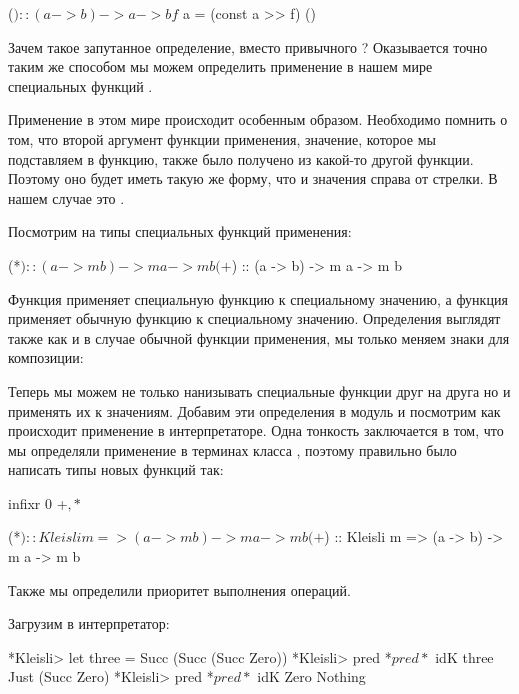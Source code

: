 \begin{code}
($) :: (a -> b) -> a -> b
f $ a = (const a >> f) ()
\end{code}

Зачем такое запутанное определение, вместо привычного ?
Оказывается точно таким же способом мы можем определить 
применение в нашем мире специальных функций .

Применение в этом мире происходит особенным образом.
Необходимо помнить о том, что второй аргумент функции применения,
значение, которое мы подставляем в функцию, также было получено 
из какой-то другой функции. Поэтому оно будет иметь такую же
форму, что и значения справа от стрелки. В нашем случае 
это \mbox{}.

Посмотрим на типы специальных функций применения:

\begin{code}
(*$) :: (a -> m b) -> m a -> m b
(+$) :: (a -> b)   -> m a -> m b
\end{code}

Функция \In{*$} применяет специальную функцию к специальному
значению, а функция \In{+$} применяет обычную функцию к 
специальному значению. Определения выглядят также как 
и в случае обычной функции применения, мы только меняем
знаки для композиции:


Теперь мы можем не только нанизывать специальные функции
друг на друга но и применять их к значениям. Добавим
эти определения в модуль  и посмотрим 
как происходит применение в интерпретаторе. Одна тонкость
заключается в том, что мы определяли применение в терминах
класса , поэтому правильно было написать типы 
новых функций так:

\begin{code}
infixr 0 +$, *$

(*$) :: Kleisli m => (a -> m b) -> m a -> m b
(+$) :: Kleisli m => (a -> b)   -> m a -> m b
\end{code}

Также мы определили приоритет выполнения операций.

Загрузим в интерпретатор:

\begin{code}
*Kleisli> let three = Succ (Succ (Succ Zero))
*Kleisli> pred *$ pred *$ idK three
Just (Succ Zero)
*Kleisli> pred *$ pred *$ idK Zero
Nothing
\end{code}

